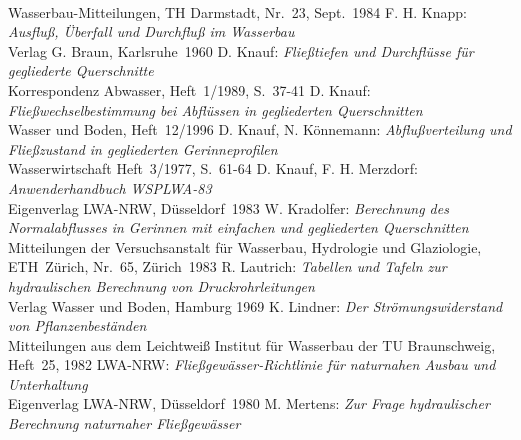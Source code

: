 \begin{thebibliography}{99}
                                 \\ Wasserbau-Mitteilungen, TH Darmstadt, Nr.~23, Sept.~1984
                  F. H. Knapp: \emph{Ausflu{\ss}, \"{U}berfall und Durchflu{\ss} im Wasserbau}
                                 \\ Verlag G. Braun, Karlsruhe~1960
                 D. Knauf: \emph{Flie{\ss}tiefen und Durchfl\"{u}sse f\"{u}r gegliederte Querschnitte}
                                 \\ Korrespondenz Abwasser, Heft~1/1989, S.~37-41
                 D. Knauf: \emph{Flie{\ss}wechselbestimmung bei Abfl\"{u}ssen in gegliederten Querschnitten}
                                 \\ Wasser und Boden, Heft~12/1996
        D. Knauf, N. K\"{o}nnemann: \emph{Abflu{\ss}verteilung und Flie{\ss}zustand in gegliederten
                                 Gerinneprofilen}
                                 \\ Wasserwirtschaft Heft~3/1977, S.~61-64
          D. Knauf, F. H. Merzdorf: \emph{Anwenderhandbuch WSPLWA-83}
                                 \\ Eigenverlag LWA-NRW, D\"{u}sseldorf~1983
              W. Kradolfer: \emph{Berechnung des Normalabflusses in Gerinnen mit einfachen und
                                 gegliederten Querschnitten}
                                 \\ Mitteilungen der Versuchsanstalt f\"{u}r Wasserbau, Hydrologie und Glaziologie,
                                 ETH~Z\"{u}rich, Nr.~65, Z\"{u}rich~1983
               R. Lautrich: \emph{Tabellen und Tafeln zur hydraulischen Berechnung von Druckrohrleitungen}
                                 \\ Verlag Wasser und Boden, Hamburg 1969
                K. Lindner: \emph{Der Str\"{o}mungswiderstand von Pflanzenbest\"{a}nden}
                                 \\ Mitteilungen aus dem Leichtwei{\ss} Institut f\"{u}r Wasserbau der TU Braunschweig,
                                    Heft~25, 1982
                LWA-NRW: \emph{Flie{\ss}gew\"{a}sser-Richtlinie f\"{u}r naturnahen Ausbau und Unterhaltung}
                                 \\ Eigenverlag LWA-NRW, D\"{u}sseldorf~1980
                M. Mertens: \emph{Zur Frage hydraulischer Berechnung naturnaher Flie{\ss}gew\"{a}sser}

\end{thebibliography}
